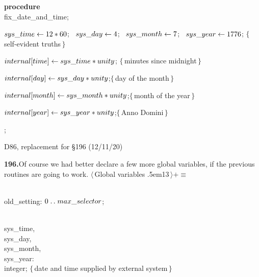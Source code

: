 \ninepoint\noindent
{\bf procedure} \\{fix\_date\_and\_time};\par
\noindent{}
$\\{sys\_time}\gets12\ast60$; \
$\\{sys\_day}\gets4$; \
$\\{sys\_month}\gets7$; \
$\\{sys\_year}\gets1776$;\quad
$\{\,$self-evident truths$\,\}$\par
\noindent\quad$\\{internal}[\\{time}]\gets\\{sys\_time}\ast\\{unity}$;\quad
  $\{\,$minutes since midnight$\,\}$\par
\noindent\quad$\\{internal}[\\{day}]\gets\\{sys\_day}\ast\\{unity}$;\quad$\{\,$day of the month$\,\}$\par
\noindent\quad$\\{internal}[\\{month}]\gets\\{sys\_month}\ast\\{unity}$;\quad$\{\,$month of the year$\,\}$\par
\noindent\quad$\\{internal}[\\{year}]\gets\\{sys\_year}\ast\\{unity}$;\quad$\{\,$Anno Domini$\,\}$\par
\noindent\quad{\bf end};

\bugonpage D86, replacement for \S196 (12/11/20)

\tenpoint\noindent
{\bf 196.}\quad Of course we had better declare a few more global variables,
if the previous routines are going to work.
\smallskip
\ninepoint\noindent
$\langle\,$Global variables {\sevenrm\kern.5em13}$\,\rangle+\equiv$\par
\noindent\\{old\_setting}: $0\mathrel{.\,.}\\{max\_selector}$;\par
\noindent\\{sys\_time}, \\{sys\_day}, \\{sys\_month}, \\{sys\_year}: \\{integer};
\quad$\{\,$date and time supplied by external system$\,\}$

